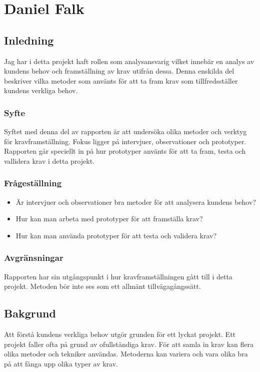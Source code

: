 \section{Daniel Falk}
\subsection{Inledning}
Jag har i detta projekt haft rollen som analysansvarig vilket innebär en analys av kundens behov och framställning av krav utifrån dessa. Denna enskilda del beskriver vilka metoder som använts för att ta fram krav som tillfredsställer kundens verkliga behov.
\subsubsection{Syfte}
Syftet med denna del av rapporten är att undersöka olika metoder och verktyg för kravframställning. Fokus ligger på intervjuer, observationer och prototyper. Rapporten går speciellt in på hur prototyper använts för att ta fram, testa och vallidera krav i detta projekt.
\subsubsection{Frågeställning}
\begin{itemize}
\item Är intervjuer och observationer bra metoder för att analysera kundens behov?
\item Hur kan man arbeta med prototyper för att framställa krav?
\item Hur kan man använda prototyper för att testa och validera krav?
\end{itemize}
\subsubsection{Avgränsningar}
Rapporten har sin utgångspunkt i hur kravframställningen gått till i detta projekt. Metoden bör inte ses som ett allmänt tillvägagångssätt.
\subsection{Bakgrund}
Att förstå kundens verkliga behov utgör grunden för ett lyckat projekt. Ett projekt faller ofta på grund av ofullständiga krav\cite{Hull}.
För att samla in krav kan flera olika metoder och tekniker användas. Metoderna kan variera och vara olika bra på att fånga upp olika typer av krav.

